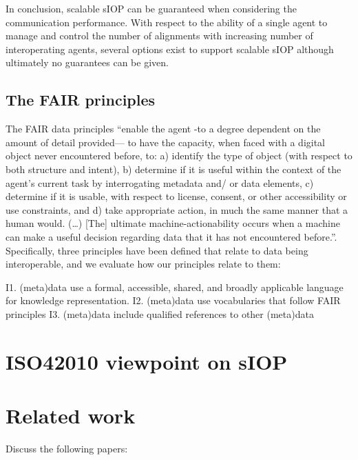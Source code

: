 \documentclass[sort&compress,preprint,authoryear,3p,twocolumn]{elsarticle}
\begin{document}
In conclusion, scalable sIOP can be guaranteed when considering the
communication performance. With respect to the ability of a single agent
to manage and control the number of alignments with increasing number of
interoperating agents, several options exist to support scalable sIOP
although ultimately no guarantees can be given.

\hypertarget{the-fair-principles}{%
\subsection{The FAIR principles}\label{the-fair-principles}}

The FAIR data principles \cite{Wilkinson2016} ``enable the agent -to a
degree dependent on the amount of detail provided--- to have the
capacity, when faced with a digital object never encountered before, to:
a) identify the type of object (with respect to both structure and
intent), b) determine if it is useful within the context of the agent's
current task by interrogating metadata and/ or data elements, c)
determine if it is usable, with respect to license, consent, or other
accessibility or use constraints, and d) take appropriate action, in
much the same manner that a human would. (\ldots) {[}The{]} ultimate
machine-actionability occurs when a machine can make a useful decision
regarding data that it has not encountered before.''. Specifically,
three principles have been defined that relate to data being
interoperable, and we evaluate how our principles relate to them:

I1. (meta)data use a formal, accessible, shared, and broadly applicable
language for knowledge representation. I2. (meta)data use vocabularies
that follow FAIR principles I3. (meta)data include qualified references
to other (meta)data

\hypertarget{iso42010-viewpoint-on-siop}{%
\section{ISO42010 viewpoint on sIOP}\label{iso42010-viewpoint-on-siop}}

\hypertarget{related-work}{%
\section{Related work}\label{related-work}}

Discuss the following papers:
\end{document}
